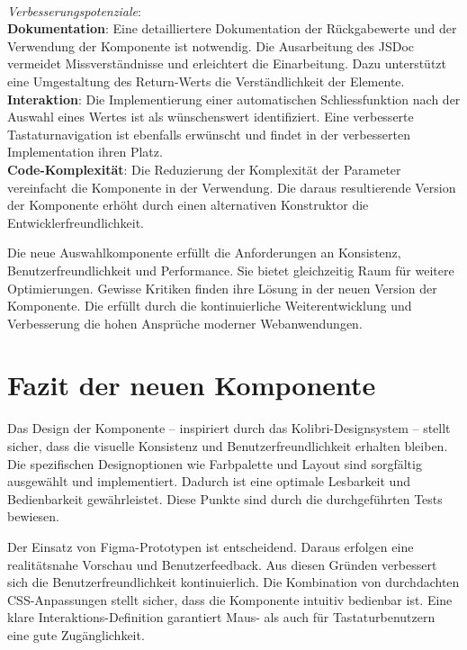 \\
\noindent
\emph{Verbesserungspotenziale}: 
\\
\textbf{Dokumentation}: 
Eine detailliertere Dokumentation der Rückgabewerte und der Verwendung der Komponente ist notwendig. 
Die Ausarbeitung des JSDoc vermeidet Missverständnisse und erleichtert die Einarbeitung. 
Dazu unterstützt eine Umgestaltung des Return-Werts die Verständlichkeit der Elemente. 
\\
\textbf{Interaktion}: 
Die Implementierung einer automatischen Schliessfunktion nach der Auswahl eines Wertes ist als wünschenswert identifiziert. 
Eine verbesserte Tastaturnavigation ist ebenfalls erwünscht und findet in der verbesserten Implementation ihren Platz. 
\\
\textbf{Code-Komplexität}: 
Die Reduzierung der Komplexität der Parameter vereinfacht die Komponente in der Verwendung. 
Die daraus resultierende Version der Komponente erhöht durch einen alternativen Konstruktor die Entwicklerfreundlichkeit. 

Die neue Auswahlkomponente erfüllt die Anforderungen an Konsistenz, Benutzerfreundlichkeit und Performance. 
Sie bietet gleichzeitig Raum für weitere Optimierungen. 
Gewisse Kritiken finden ihre Lösung in der neuen Version der Komponente. 
Die  erfüllt durch die kontinuierliche Weiterentwicklung und Verbesserung die hohen Ansprüche moderner Webanwendungen. 


\section{Fazit der neuen Komponente}
\label{sec:summeryNew}

Das Design der Komponente – inspiriert durch das Kolibri-Designsystem – stellt sicher, dass die visuelle Konsistenz und Benutzerfreundlichkeit erhalten bleiben. 
Die spezifischen Designoptionen wie Farbpalette und Layout sind sorgfältig ausgewählt und implementiert. 
Dadurch ist eine optimale Lesbarkeit und Bedienbarkeit gewährleistet. 
Diese Punkte sind durch die durchgeführten Tests bewiesen. 

Der Einsatz von Figma-Prototypen ist entscheidend. 
Daraus erfolgen eine realitätsnahe Vorschau und Benutzerfeedback. 
Aus diesen Gründen verbessert sich die Benutzerfreundlichkeit kontinuierlich. 
Die Kombination von durchdachten CSS-Anpassungen stellt sicher, dass die Komponente intuitiv bedienbar ist. 
Eine klare Interaktions-Definition garantiert Maus- als auch für Tastaturbenutzern eine gute Zugänglichkeit. 

